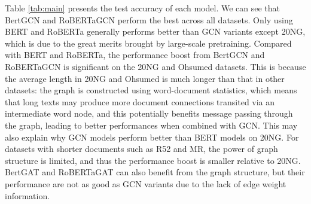 \documentclass[11pt,a4paper]{article}
\begin{document}
\begin{table}
  \small
  \centering
  \caption{Results for different models on transductive text classification datasets. We run all models 10 times and report the mean test accuracy.}
  \label{tab:main}
\end{table}


Table \ref{tab:main} presents the test accuracy of each model. We can see that BertGCN and RoBERTaGCN perform the best across all datasets. Only using BERT and RoBERTa generally performs better than  GCN variants except 20NG, which is due to the great merits brought by large-scale pretraining. 
Compared with BERT and RoBERTa, the performance boost from BertGCN and RoBERTaGCN is significant on the 20NG and Ohsumed datasets. This is because the average length in 20NG and Ohsumed is much longer than that in other datasets:
the graph is constructed using word-document statistics, which means that long texts may produce more document connections transited via an intermediate word node, and this potentially benefits message passing through the graph, leading to better performances when combined with GCN.
This may also explain why GCN models perform better than BERT models on 20NG.
For datasets with shorter documents such as R52 and MR, the power of graph structure is limited, and thus the performance boost is smaller relative to 20NG. 
BertGAT and RoBERTaGAT can also benefit from the graph structure, but their performance are not as good as GCN variants due to the lack of edge weight information.
\end{document}
